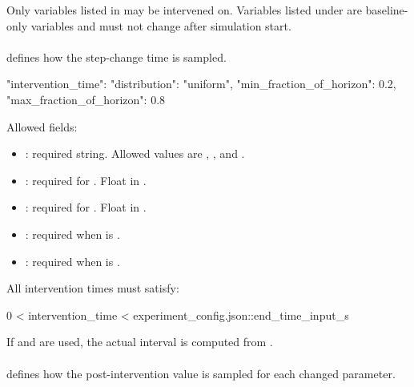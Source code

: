 \documentclass[11pt]{article}
\begin{document}
Only variables listed in  may be intervened on.
Variables listed under  are baseline-only variables and must not change after simulation start.

\paragraph{\texorpdfstring{}{intervention\_time}}

 defines how the step-change time is sampled.

\begin{DocCode}
"intervention_time": {
  "distribution": "uniform",
  "min_fraction_of_horizon": 0.2,
  "max_fraction_of_horizon": 0.8
}
\end{DocCode}

Allowed fields:

\begin{itemize}
\item {}: required string. Allowed values are , , and .
\item {}: required for . Float in \code{[0,1]}.
\item {}: required for . Float in \code{[0,1]}.
\item {}: required when  is .
\item {}: required when  is .
\end{itemize}

All intervention times must satisfy:

\begin{DocCode}
0 < intervention_time < experiment_config.json::end_time_input_s
\end{DocCode}

If  and  are used, the actual interval is computed from .

\paragraph{\texorpdfstring{}{value\_sampler}}

 defines how the post-intervention value is sampled for each changed parameter.
\end{document}
